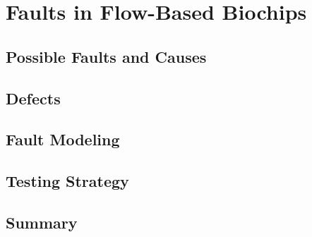 \chapter{Faults in Flow-Based Biochips}

\section{Possible Faults and Causes}

\section{Defects}

\section{Fault Modeling}

\section{Testing Strategy}

\section{Summary}